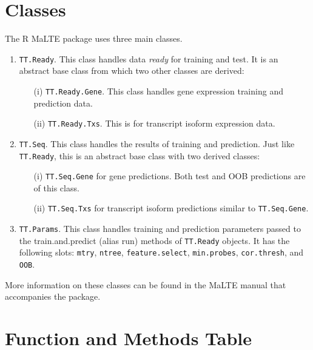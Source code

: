 \documentclass[a4paper,12pt]{article}
\begin{document}
\section{Classes}
\label{classes}
The \textsf{R} \textsf{MaLTE} package uses three main classes.
\begin{enumerate}
\item \texttt{TT.Ready}. This class handles data \textit{ready} for training and test. It is an abstract base class from which two other classes are derived:
\begin{enumerate}
\item[(i)] \texttt{TT.Ready.Gene}. This class handles gene expression training and prediction data.
\item[(ii)] \texttt{TT.Ready.Txs}. This is for transcript isoform expression data.
\end{enumerate}

\item \texttt{TT.Seq}. This class handles the results of training and prediction. Just like \texttt{TT.Ready}, this is an abstract base class with two derived classes:
\begin{enumerate}
\item[(i)] \texttt{TT.Seq.Gene} for gene predictions. Both test and OOB predictions are of this class.
\item[(ii)] \texttt{TT.Seq.Txs} for transcript isoform predictions similar to \texttt{TT.Seq.Gene}.
\end{enumerate}

\item \texttt{TT.Params}. This class handles training and prediction parameters passed to the train.and.predict (alias run) methods of \texttt{TT.Ready} objects. It has the following slots: \texttt{mtry}, \texttt{ntree}, \texttt{feature.select}, \texttt{min.probes}, \texttt{cor.thresh}, and \texttt{OOB}.
\end{enumerate}

More information on these classes can be found in the \textsf{MaLTE} manual that accompanies the package.

\pagebreak
\section{Function and Methods Table}
\label{functions}
\end{document}

